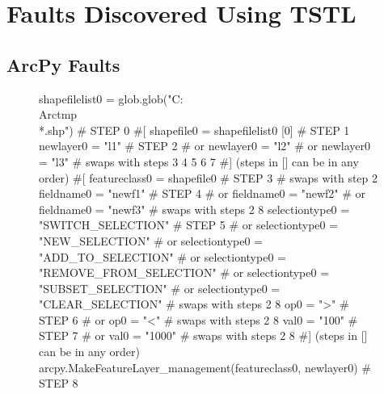\section{Faults Discovered Using TSTL}

\subsection{ArcPy Faults}

\begin{figure}
{\scriptsize 
\begin{code}
shapefilelist0 = glob.glob("C:\\Arctmp\\*.shp")                             \textcolor{black!60}{\# STEP 0}
\textcolor{black!60}{\#[}
shapefile0 = shapefilelist0 [0]                                           \textcolor{black!60}{\# STEP 1}
newlayer0 = "l1"                                                          \textcolor{black!60}{\# STEP 2}
\textcolor{black!60}{\#  or newlayer0 = "l2" }
\textcolor{black!60}{\#  or newlayer0 = "l3" }
\textcolor{black!60}{\#  swaps with steps 3 4 5 6 7}
\textcolor{black!60}{\#] (steps in [] can be in any order)}
\textcolor{black!60}{\#[}
featureclass0 = shapefile0                                                \textcolor{black!60}{\# STEP 3}
\textcolor{black!60}{\#  swaps with step 2}
fieldname0 = "newf1"                                                      \textcolor{black!60}{\# STEP 4}
\textcolor{black!60}{\#  or fieldname0 = "newf2" }
\textcolor{black!60}{\#  or fieldname0 = "newf3" }
\textcolor{black!60}{\#  swaps with steps 2 8}
selectiontype0 = "SWITCH\_SELECTION"                                       \textcolor{black!60}{\# STEP 5}
\textcolor{black!60}{\#  or selectiontype0 = "NEW\_SELECTION" }
\textcolor{black!60}{\#  or selectiontype0 = "ADD\_TO\_SELECTION" }
\textcolor{black!60}{\#  or selectiontype0 = "REMOVE\_FROM\_SELECTION"}
\textcolor{black!60}{\#  or selectiontype0 = "SUBSET\_SELECTION"}
\textcolor{black!60}{\#  or selectiontype0 = "CLEAR\_SELECTION"   }
\textcolor{black!60}{\#  swaps with steps 2 8}
op0 = ">"                                                                 \textcolor{black!60}{\# STEP 6}
\textcolor{black!60}{\#  or op0 = "<" }
\textcolor{black!60}{\#  swaps with steps 2 8}
val0 = "100"                                                              \textcolor{black!60}{\# STEP 7}
\textcolor{black!60}{\#  or val0 = "1000" }
\textcolor{black!60}{\#  swaps with steps 2 8}
\textcolor{black!60}{\#] (steps in [] can be in any order)}
arcpy.MakeFeatureLayer\_management(featureclass0, newlayer0)               \textcolor{black!60}{\# STEP 8}

\end{code}}
\end{figure}
